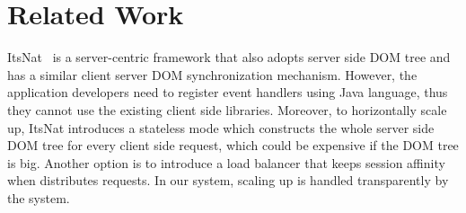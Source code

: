 \section{Related Work}
\label{sec:related}
ItsNat~\cite{santamariaitsnat} is a server-centric framework that also adopts server side DOM tree
and has a similar client server DOM synchronization mechanism.
However, the application developers need to register event handlers using Java
language, thus they cannot use the existing client side \js{} libraries.
Moreover, to horizontally scale up, ItsNat introduces a stateless mode which
constructs the whole server side DOM tree for every client side request,
which could be expensive if the DOM tree is big.
Another option is to introduce a load balancer that 
keeps session affinity when distributes requests.
In our system, scaling up is handled transparently by the system.




